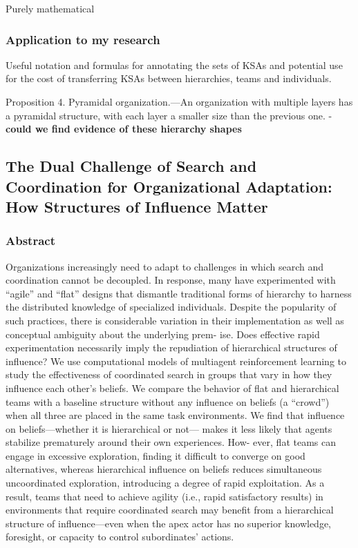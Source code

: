 \documentclass[12pt]{article}
\begin{document}
Purely mathematical

\subsubsection*{Application to my research}

Useful notation and formulas for annotating the sets of KSAs and potential use for the cost of transferring KSAs between hierarchies, teams and individuals. 

Proposition 4. Pyramidal organization.—An organization with multiple layers has a pyramidal structure, with each layer a smaller size than the previous one. - \textbf{could we find evidence of these hierarchy shapes}


\subsection*{The Dual Challenge of Search and Coordination for Organizational Adaptation: How Structures of Influence Matter\cite{dual_challenge}}

\subsubsection*{Abstract}
Organizations increasingly need to adapt to challenges in which search and coordination cannot be decoupled. In response, many have experimented with “agile” and “flat” designs that dismantle traditional forms of hierarchy to harness the distributed knowledge of specialized individuals. Despite the popularity of such practices, there is considerable variation in their implementation as well as conceptual ambiguity about the underlying prem- ise. Does effective rapid experimentation necessarily imply the repudiation of hierarchical structures of influence? We use computational models of multiagent reinforcement learning to study the effectiveness of coordinated search in groups that vary in how they influence each other’s beliefs. We compare the behavior of flat and hierarchical teams with a baseline structure without any influence on beliefs (a “crowd”) when all three are placed in the same task environments. We find that influence on beliefs—whether it is hierarchical or not— makes it less likely that agents stabilize prematurely around their own experiences. How- ever, flat teams can engage in excessive exploration, finding it difficult to converge on good alternatives, whereas hierarchical influence on beliefs reduces simultaneous uncoordinated exploration, introducing a degree of rapid exploitation. As a result, teams that need to achieve agility (i.e., rapid satisfactory results) in environments that require coordinated search may benefit from a hierarchical structure of influence—even when the apex actor has no superior knowledge, foresight, or capacity to control subordinates’ actions.
\end{document}
